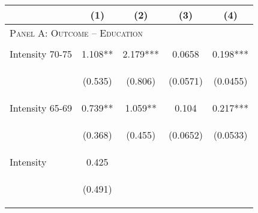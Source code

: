 \begin{subtables}
\begin{table}[htpb!]									
\begin{center}									
\begin{tabular}{p{5cm}cccc}	\toprule								
	&	(1)	&	(2)	&	(3)	&	(4)	\\ \midrule
\multicolumn{5}{l}{\textsc{Panel A: Outcome -- Education}}									\\  
\vspace{4pt}	&	\begin{footnotesize}\end{footnotesize}	&	\begin{footnotesize}\end{footnotesize}	&	\begin{footnotesize}\end{footnotesize}	&	\begin{footnotesize}\end{footnotesize}	 \\
Intensity 70-75	&	1.108**	&	2.179***	&	0.0658	&	0.198***	 \\
	& \begin{footnotesize}	(0.535)	\end{footnotesize} & \begin{footnotesize}	(0.806)	\end{footnotesize} & \begin{footnotesize}	(0.0571)	\end{footnotesize} & \begin{footnotesize}	(0.0455)	\end{footnotesize} \\
Intensity 65-69	&	0.739**	&	1.059**	&	0.104	&	0.217***	 \\
	& \begin{footnotesize}	(0.368)	\end{footnotesize} & \begin{footnotesize}	(0.455)	\end{footnotesize} & \begin{footnotesize}	(0.0652)	\end{footnotesize} & \begin{footnotesize}	(0.0533)	\end{footnotesize} \\
Intensity  	&	0.425	&		&		&		 \\
	& \begin{footnotesize}	(0.491)	\end{footnotesize} & \begin{footnotesize}		\end{footnotesize} & \begin{footnotesize}		\end{footnotesize} & \begin{footnotesize}		\end{footnotesize} \\

\end{tabular}
\end{center}
\end{table}
\end{subtables}
